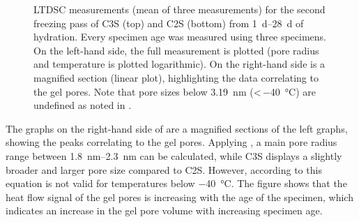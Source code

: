 \begin{figure}[!htb]
\begin{subfigure}{.47\textwidth}
	\end{subfigure}

    \caption{
		\ac{LTDSC} measurements (mean of three measurements) for the second freezing pass of \ac{C3S} (top) and \ac{C2S} (bottom) from \qtyrange{1}{28}{\day} of hydration.
		Every specimen age was measured using three specimens.
		On the left-hand side, the full measurement is plotted (pore radius and temperature is plotted logarithmic).
		On the right-hand side is a magnified section (linear plot), highlighting the data correlating to the gel pores.
		Note that pore sizes below \qty{3.19}{\nano\meter} (<\,\qty{-40}{\celsius}) are undefined as noted in .
	}
    \label{fig:ltdsc_result_freeze}
\end{figure}

The graphs on the right-hand side of  are a magnified sections of the left graphs, showing the peaks correlating to the gel pores.
Applying , a main pore radius range between \qtyrange{1.8}{2.3}{\nano\meter} can be calculated, while \ac{C3S} displays a slightly broader and larger pore size compared to \ac{C2S}.
However, according to \textcite{brun.1977} this equation is not valid for temperatures below \qty{-40}{\celsius}.
The figure shows that the heat flow signal of the gel pores is increasing with the age of the specimen, which indicates an increase in the gel pore volume with increasing specimen age.

